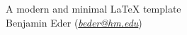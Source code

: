 \documentclass{article}
\makeatletter
\newcommand{\metatitle}{A modern and minimal LaTeX template}
\newcommand{\metaauthor}{Benjamin Eder}
\newcommand{\metaemail}{beder@hm.edu}
\makeatother
\begin{document}
    \begin{center}
        \Huge \metatitle \\[0.6cm]
        \large \metaauthor \hspace{3pt} (\textit{\href{mailto:\metaemail}{\metaemail}}) \\[1.5cm]
    \end{center}

    \tableofcontents %

    \fontsize{11pt}{16pt}\selectfont %
    

    \printbibliography
\end{document}
